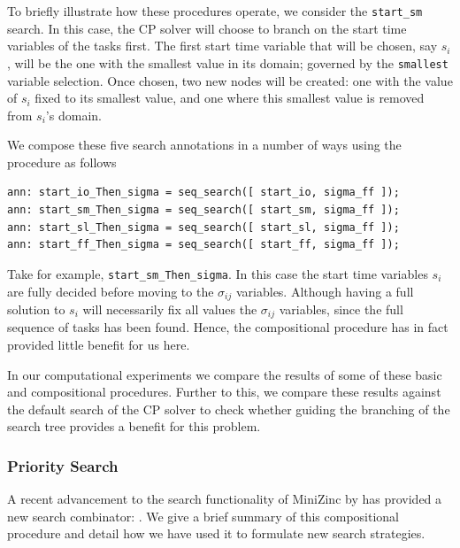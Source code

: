 To briefly illustrate how these procedures
operate, we consider the {\tt start\_sm} search.
In this case, the CP solver will choose to branch on the
start time variables of the tasks first.
The first start time variable that will be chosen, say $s_i$,
will be the one with the smallest value in its domain;
governed by the {\tt smallest} variable selection.
Once chosen, two new nodes will be created:
one with the value of $s_i$ fixed to its smallest
value, and one where this smallest value is removed from
$s_i$'s domain.

We compose these five search annotations in a number of ways using
the  procedure as follows
\begin{lstlisting}[language=minizinc]
ann: start_io_Then_sigma = seq_search([ start_io, sigma_ff ]);
ann: start_sm_Then_sigma = seq_search([ start_sm, sigma_ff ]);
ann: start_sl_Then_sigma = seq_search([ start_sl, sigma_ff ]);
ann: start_ff_Then_sigma = seq_search([ start_ff, sigma_ff ]);
\end{lstlisting}%
Take for example, {\tt start\_sm\_Then\_sigma}.
In this case the start time variables $s_i$ are fully decided
before moving to the $\sigma_{ij}$ variables.
Although having a full solution to $s_i$ will necessarily 
fix all values the $\sigma_{ij}$ variables, since
the full sequence of tasks has been found.
Hence, the compositional procedure has in fact provided
little benefit for us here.

In our computational experiments we compare the
results of some of these basic and compositional
procedures.
Further to this, we compare these results
against the default search of the CP solver
\chuffed to check whether guiding the
branching of the search tree provides a benefit
for this problem.

\subsubsection{Priority Search}
\label{sec:bend:cpPriSearch}
A recent advancement to the search
functionality of MiniZinc by 
has provided a new search combinator:
\priser.
We give a brief summary of this compositional
procedure and detail how we have used it
to formulate new search strategies.

